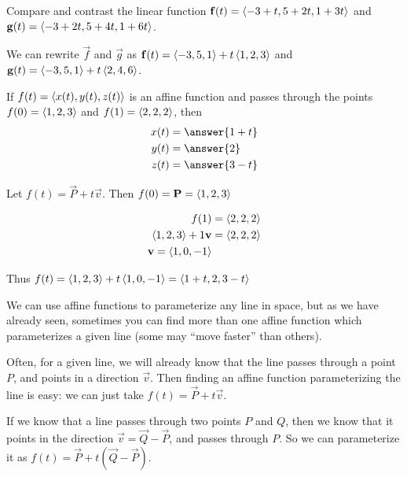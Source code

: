 \documentclass{ximera}
\begin{document}
\begin{question}
   Compare and contrast the linear function $\mathbf{f}(t) =
   \left\langle -3+t,5+2t,1+3t\right\rangle$ and $\mathbf{g}(t)=\left\langle -3+2t,5+4t,1+6t\right\rangle$.
   \begin{multipleChoice}
   \end{multipleChoice}
   \begin{hint}
     We can rewrite $\vec{f}$ and $\vec{g}$ as $\mathbf{f}(t) =
     \left\langle -3,5,1\right\rangle+t\left\langle 1,2,3\right\rangle$ and
     $\mathbf{g}(t)=\left\langle -3,5,1\right\rangle+t\left\langle 2,4,6\right\rangle$.
   \end{hint}
 \end{question}
  
\begin{question}
  If $f(t) = \left\langle x(t),y(t),z(t)\right\rangle$ is an affine function and passes
  through the points $f(0) = \left\langle 1,2,3\right\rangle$ and $f(1) =
  \left\langle 2,2,2\right\rangle$, then
  \begin{align*}
    x(t) &= \answer{1+t}\\
    y(t) &= \answer{2}\\
    z(t) &= \answer{3-t}
  \end{align*}
  \begin{hint}
    Let $f(t) = \vec{P}+t\vec{v}$.  Then $f(0) = \mathbf{P} = \left\langle 1,2,3\right\rangle$
  \end{hint}
  \begin{hint}
    \begin{align*}
      f(1) &= \left\langle 2,2,2\right\rangle\\
      \left\langle 1,2,3\right\rangle+1\mathbf{v} &= \left\langle 2,2,2\right\rangle\\
      \mathbf{v} = \left\langle 1,0,-1\right\rangle
    \end{align*}
  \end{hint}
  \begin{hint}
    Thus $f(t) = \left\langle 1,2,3\right\rangle+t\left\langle 1,0,-1\right\rangle = \left\langle 1+t,2,3-t\right\rangle$
  \end{hint}
\end{question}

\begin{explanation}
  We can use affine functions to parameterize any line in space, but
  as we have already seen, sometimes you can find more than one affine
  function which parameterizes a given line (some may ``move faster''
  than others).
  
  Often, for a given line, we will already know that the line passes
  through a point $P$, and points in a direction $\vec{v}$.  Then
  finding an affine function parameterizing the line is easy: we can
  just take $f(t) = \vec{P}+t\vec{v}$.
  
  If we know that a line passes through two points $P$ and $Q$, then
  we know that it points in the direction $\vec{v} = \vec{Q} -
  \vec{P}$, and passes through $P$.  So we can parameterize it as
  $f(t) = \vec{P}+t(\vec{Q} - \vec{P})$.
\end{explanation}
\end{document}
